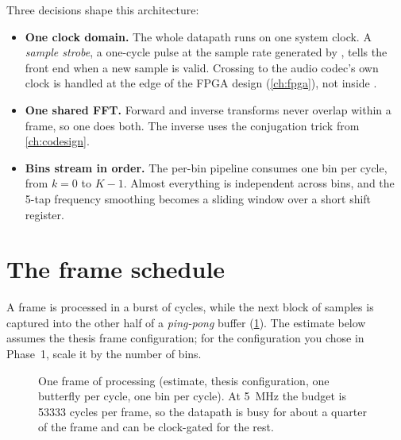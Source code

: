 Three decisions shape this architecture:
\begin{itemize}
  \item \textbf{One clock domain.} The whole datapath runs on one system clock.
  A \emph{sample strobe}, a one-cycle pulse at the sample rate generated by
  , tells the front end when a new sample is valid. Crossing to
  the audio codec's own clock is handled at the edge of the FPGA design
  (\cref{ch:fpga}), not inside .
  \item \textbf{One shared FFT.} Forward and inverse transforms never overlap
  within a frame, so one  does both. The inverse uses the
  conjugation trick from \cref{ch:codesign}.
  \item \textbf{Bins stream in order.} The per-bin pipeline consumes one bin per
  cycle, from $k=0$ to $K-1$. Almost everything is independent across bins,
  and the 5-tap frequency smoothing becomes a sliding window over a short shift
  register.
\end{itemize}

\section{The frame schedule}\label{sec:rtl:schedule}

A frame is processed in a burst of cycles, while the next block of samples is
captured into the other half of a \emph{ping-pong} buffer
(\cref{fig:rtl:schedule}). The estimate below assumes the thesis frame
configuration; for the configuration you chose in Phase~1, scale it by the
number of bins.

\begin{figure}[htbp]
\centering
{}
\caption{One frame of processing (estimate, thesis configuration, one butterfly
per cycle, one bin per cycle). At \qty{5}{\MHz} the budget is \num{53333} cycles
per frame, so the datapath is busy for about a quarter of the frame and can be
clock-gated for the rest.}
\label{fig:rtl:schedule}
\end{figure}

